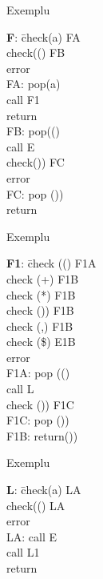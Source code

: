 \documentclass[pdf]{beamer}
\begin{document}
\begin{frame}{Exemplu}
\begin{tabbing}
\textbf{F}: \= check(a) FA\\
            \> check(() FB\\
            \> error\\
FA: pop(a)\\
    \> call F1\\
    \> return\\
FB: pop(()\\
    \> call E\\
    \> check()) FC\\
    \> error\\
FC: pop ())\\
    \> return\\
\end{tabbing}
\end{frame}



\begin{frame}{Exemplu}
\begin{tabbing}
\textbf{F1}: \= check (() F1A\\
             \> check (+) F1B\\
             \> check (*) F1B\\
             \> check ()) F1B\\
             \> check (,) F1B\\
             \> check (\$) E1B\\
             \> error\\
F1A: pop (()\\
     \> call L\\
     \> check ()) F1C\\
F1C: pop ())\\
F1B: return())\\
\end{tabbing}
\end{frame}



\begin{frame}{Exemplu}
\begin{tabbing}
\textbf{L}: \= check(a) LA\\
            \> check(() LA\\
            \> error\\
LA: call E\\
    \> call L1\\
    \> return\\
\end{tabbing}
\end{frame}
\end{document}
